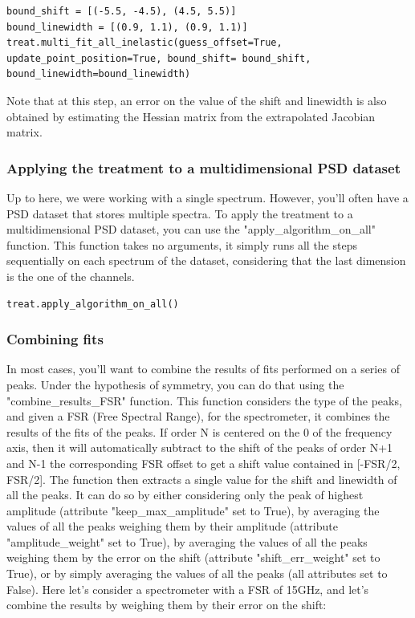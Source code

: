 \documentclass{article}
\begin{document}
\begin{lstlisting}
bound_shift = [(-5.5, -4.5), (4.5, 5.5)]
bound_linewidth = [(0.9, 1.1), (0.9, 1.1)]
treat.multi_fit_all_inelastic(guess_offset=True, update_point_position=True, bound_shift= bound_shift, bound_linewidth=bound_linewidth)  
\end{lstlisting}

Note that at this step, an error on the value of the shift and linewidth is also obtained by estimating the Hessian matrix from the extrapolated Jacobian matrix.

\subsubsection{Applying the treatment to a multidimensional PSD dataset}

Up to here, we were working with a single spectrum. However, you'll often have a PSD dataset that stores multiple spectra. To apply the treatment to a multidimensional PSD dataset, you can use the "apply\_algorithm\_on\_all" function. This function takes no arguments, it simply runs all the steps sequentially on each spectrum of the dataset, considering that the last dimension is the one of the channels.

\begin{lstlisting}
treat.apply_algorithm_on_all()
\end{lstlisting}

\subsubsection{Combining fits}

In most cases, you'll want to combine the results of fits performed on a series of peaks. Under the hypothesis of symmetry, you can do that using the "combine\_results\_FSR" function. This function considers the type of the peaks, and given a FSR (Free Spectral Range), for the spectrometer, it combines the results of the fits of the peaks. If order N is centered on the 0 of the frequency axis, then it will automatically subtract to the shift of the peaks of order N+1 and N-1 the corresponding FSR offset to get a shift value contained in [-FSR/2, FSR/2]. The function then extracts a single value for the shift and linewidth of all the peaks. It can do so by either considering only the peak of highest amplitude (attribute "keep\_max\_amplitude" set to True), by averaging the values of all the peaks weighing them by their amplitude (attribute "amplitude\_weight" set to True), by averaging the values of all the peaks weighing them by the error on the shift (attribute "shift\_err\_weight" set to True), or by simply averaging the values of all the peaks (all attributes set to False). Here let's consider a spectrometer with a FSR of 15GHz, and let's combine the results by weighing them by their error on the shift:
\end{document}
